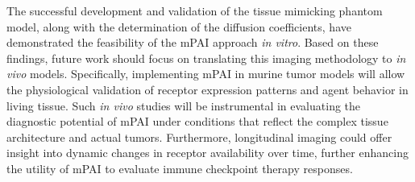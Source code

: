 The successful development and validation of the tissue mimicking phantom model, along with the determination of the diffusion coefficients, have demonstrated the feasibility of the mPAI approach \textit{in vitro}. Based on these findings, future work should focus on translating this imaging methodology to \textit{in vivo} models. Specifically, implementing mPAI in murine tumor models will allow the physiological validation of receptor expression patterns and agent behavior in living tissue. Such \textit{in vivo} studies will be instrumental in evaluating the diagnostic potential of mPAI under conditions that reflect the complex tissue architecture and actual tumors. Furthermore, longitudinal imaging could offer insight into dynamic changes in receptor availability over time, further enhancing the utility of mPAI to evaluate immune checkpoint therapy responses.